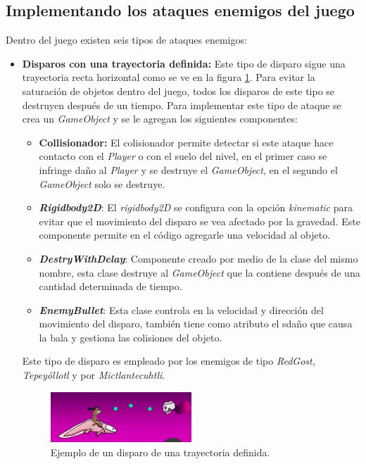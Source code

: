 \subsection{Implementando los ataques enemigos del juego}
Dentro del juego existen seis tipos de ataques enemigos:
	\begin{itemize}
		\item \textbf{Disparos con una trayectoria definida:} Este tipo de 
		disparo sigue una trayectoria recta horizontal como se ve en la figura 		
		\ref{fig:Enemyshot}. 
		Para evitar la saturación de objetos dentro del juego, todos los disparos de 
		este tipo se destruyen después de un tiempo. Para implementar este tipo de 
		ataque se crea un \textit{GameObject} y se le agregan los siguientes 
		componentes: 
			\begin{itemize}
				\item \textbf{Collisionador:} El colisionador permite detectar si este 
				ataque hace contacto con el \textit{Player} o con el suelo del nivel, 
				en el primer caso se infringe daño al \textit{Player} y se destruye el 
				\textit{GameObject}, en el segundo el \textit{GameObject} solo se 
				destruye. 
				\item \textbf{\textit{Rigidbody2D}}: El \textit{rigidbody2D} se 
				configura 
				con la opción \textit{kinematic} para evitar que el movimiento del 
				disparo se vea afectado por la gravedad. Este componente permite en el 
				código agregarle una velocidad al objeto.
				\item \textbf{\textit{DestryWithDelay}}: Componente creado por medio de 
				la clase del mismo nombre, esta clase destruye al \textit{GameObject} 
				que la contiene después de una cantidad determinada de tiempo.
				\item \textbf{\textit{EnemyBullet}}: Esta clase controla en la velocidad 
				y dirección del movimiento del disparo, también tiene como atributo el 
				sdaño que causa la bala y gestiona las colisiones del objeto.
			\end{itemize}
		Este tipo de disparo es empleado por los enemigos de tipo \textit{RedGost, 
		Tepeyóllotl} y por \textit{Mictlantecuhtli}.
			
			\begin{figure}[h]
    			\centering
    			\includegraphics[width=0.5\textwidth]{03TrabajoRealizado/imagenes/disparoTrayectoria.png}
    			\caption{Ejemplo de un disparo de una trayectoria definida.}
    			\label{fig:Enemyshot}
			\end{figure}
			

\end{itemize}
